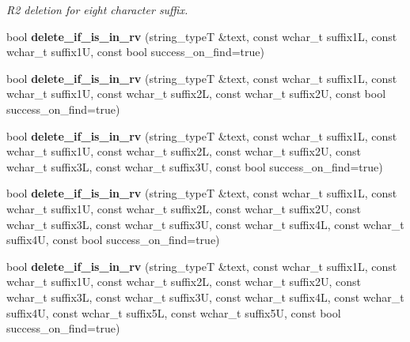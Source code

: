 \begin{DoxyCompactItemize}
\begin{DoxyCompactList}\small\item\em R2 deletion for eight character suffix. \end{DoxyCompactList}\item 
\hypertarget{group___stemming_ga3754d998db70ac20861ab3e87c3e5f25}{bool {\bfseries delete\-\_\-if\-\_\-is\-\_\-in\-\_\-rv} (string\-\_\-type\-T \&text, const wchar\-\_\-t suffix1\-L, const wchar\-\_\-t suffix1\-U, const bool success\-\_\-on\-\_\-find=true)}\label{group___stemming_ga3754d998db70ac20861ab3e87c3e5f25}

\item 
\hypertarget{group___stemming_ga5d0a95806d9264f7238bf425311d1dfc}{bool {\bfseries delete\-\_\-if\-\_\-is\-\_\-in\-\_\-rv} (string\-\_\-type\-T \&text, const wchar\-\_\-t suffix1\-L, const wchar\-\_\-t suffix1\-U, const wchar\-\_\-t suffix2\-L, const wchar\-\_\-t suffix2\-U, const bool success\-\_\-on\-\_\-find=true)}\label{group___stemming_ga5d0a95806d9264f7238bf425311d1dfc}

\item 
\hypertarget{group___stemming_ga70623a86bd9b759befe998a364d2bad2}{bool {\bfseries delete\-\_\-if\-\_\-is\-\_\-in\-\_\-rv} (string\-\_\-type\-T \&text, const wchar\-\_\-t suffix1\-L, const wchar\-\_\-t suffix1\-U, const wchar\-\_\-t suffix2\-L, const wchar\-\_\-t suffix2\-U, const wchar\-\_\-t suffix3\-L, const wchar\-\_\-t suffix3\-U, const bool success\-\_\-on\-\_\-find=true)}\label{group___stemming_ga70623a86bd9b759befe998a364d2bad2}

\item 
\hypertarget{group___stemming_gaa14e355385422f170a184e1e2182c6b0}{bool {\bfseries delete\-\_\-if\-\_\-is\-\_\-in\-\_\-rv} (string\-\_\-type\-T \&text, const wchar\-\_\-t suffix1\-L, const wchar\-\_\-t suffix1\-U, const wchar\-\_\-t suffix2\-L, const wchar\-\_\-t suffix2\-U, const wchar\-\_\-t suffix3\-L, const wchar\-\_\-t suffix3\-U, const wchar\-\_\-t suffix4\-L, const wchar\-\_\-t suffix4\-U, const bool success\-\_\-on\-\_\-find=true)}\label{group___stemming_gaa14e355385422f170a184e1e2182c6b0}

\item 
\hypertarget{group___stemming_gadb10d6f58dca24420ce2b1fd7e58928f}{bool {\bfseries delete\-\_\-if\-\_\-is\-\_\-in\-\_\-rv} (string\-\_\-type\-T \&text, const wchar\-\_\-t suffix1\-L, const wchar\-\_\-t suffix1\-U, const wchar\-\_\-t suffix2\-L, const wchar\-\_\-t suffix2\-U, const wchar\-\_\-t suffix3\-L, const wchar\-\_\-t suffix3\-U, const wchar\-\_\-t suffix4\-L, const wchar\-\_\-t suffix4\-U, const wchar\-\_\-t suffix5\-L, const wchar\-\_\-t suffix5\-U, const bool success\-\_\-on\-\_\-find=true)}\label{group___stemming_gadb10d6f58dca24420ce2b1fd7e58928f}


\end{DoxyCompactItemize}
